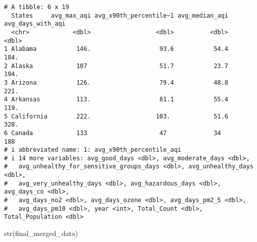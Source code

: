 \documentclass[
  12pt,
]{article}
\newenvironment{Shaded}{\begin{snugshade}}{\end{snugshade}}
\newcommand{\FunctionTok}[1]{\textcolor[rgb]{0.28,0.35,0.67}{#1}}
\newcommand{\NormalTok}[1]{\textcolor[rgb]{0.00,0.23,0.31}{#1}}
\begin{document}
\begin{verbatim}
# A tibble: 6 x 19
  States     avg_max_aqi avg_x90th_percentile~1 avg_median_aqi avg_days_with_aqi
  <chr>            <dbl>                  <dbl>          <dbl>             <dbl>
1 Alabama           146.                   93.6           54.4              184.
2 Alaska            107                    51.7           23.7              194.
3 Arizona           126.                   79.4           48.8              221.
4 Arkansas          113.                   81.1           55.4              119.
5 California        222.                  103.            51.6              328.
6 Canada            133                    47             34                188 
# i abbreviated name: 1: avg_x90th_percentile_aqi
# i 14 more variables: avg_good_days <dbl>, avg_moderate_days <dbl>,
#   avg_unhealthy_for_sensitive_groups_days <dbl>, avg_unhealthy_days <dbl>,
#   avg_very_unhealthy_days <dbl>, avg_hazardous_days <dbl>, avg_days_co <dbl>,
#   avg_days_no2 <dbl>, avg_days_ozone <dbl>, avg_days_pm2_5 <dbl>,
#   avg_days_pm10 <dbl>, year <int>, Total_Count <dbl>, Total_Population <dbl>
\end{verbatim}

\begin{Shaded}
\begin{Highlighting}[]
\FunctionTok{str}\NormalTok{(final\_merged\_data)}
\end{Highlighting}
\end{Shaded}
\end{document}
